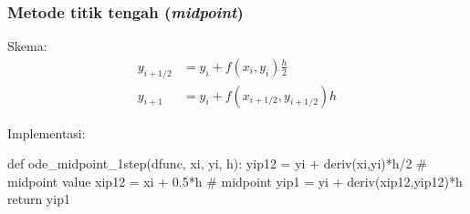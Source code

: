 \begin{frame}[fragile]
\frametitle{Metode titik tengah (\textit{midpoint})}

Skema:
\begin{align*}
y_{i+1/2} & = y_{i} + f(x_i, y_i) \frac{h}{2} \\
y_{i+1} & = y_{i} + f(x_{i+1/2}, y_{i+1/2}) h
\end{align*}

Implementasi:
\begin{pythoncode}
def ode_midpoint_1step(dfunc, xi, yi, h):
    yip12 = yi + deriv(xi,yi)*h/2  # midpoint value
    xip12 = xi + 0.5*h             # midpoint
    yip1 = yi + deriv(xip12,yip12)*h
    return yip1
\end{pythoncode}

\end{frame}


